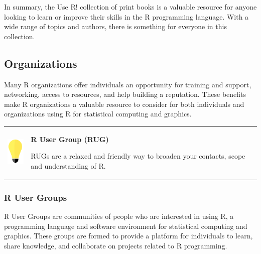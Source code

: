 \documentclass[
]{book}
\begin{document}
In summary, the Use R! collection of print books is a valuable resource for anyone looking to learn or improve their skills in the R programming language. With a wide range of topics and authors, there is something for everyone in this collection.

\hypertarget{organizations}{%
\subsection*{Organizations}\label{organizations}}

Many R organizations offer individuals an opportunity for training and support, networking, access to resources, and help building a reputation. These benefits make R organizations a valuable resource to consider for both individuals and organizations using R for statistical computing and graphics.

\hfill\break

\begin{longtable}[]{@{}
  >{\raggedright\arraybackslash}p{}
  >{\raggedright\arraybackslash}p{}@{}}
\toprule\noalign{}
\endhead
\bottomrule\noalign{}
\endlastfoot
\includegraphics[width=\textwidth,height=0.70833in]{images/01.png} & \textbf{R User Group (RUG)}

RUGs are a relaxed and friendly way to broaden your contacts, scope and understanding of R. \textbar{} \\
\end{longtable}

\hfill\break

\hypertarget{r-user-groups}{%
\subsubsection*{R User Groups}\label{r-user-groups}}

R User Groups are communities of people who are interested in using R, a programming language and software environment for statistical computing and graphics. These groups are formed to provide a platform for individuals to learn, share knowledge, and collaborate on projects related to R programming.
\end{document}
